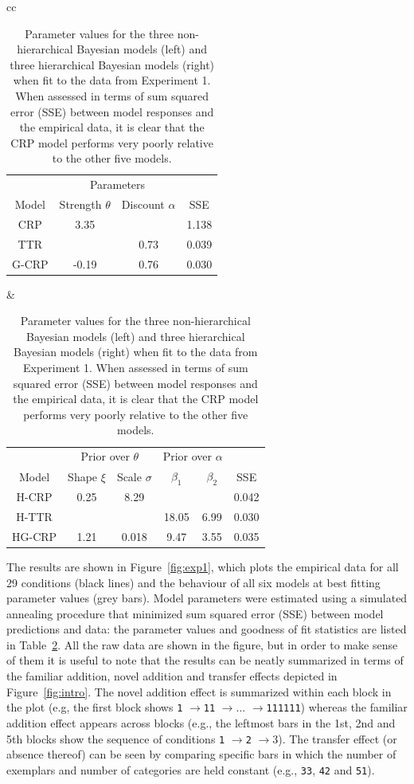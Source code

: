 \documentclass[doc]{apa6}
\newcommand{\dist}[1]{\texttt{#1}}
\newcommand{\goesto}{$\rightarrow$}
\begin{document}
\begin{table}[t]
\caption{Parameter values for the three non-hierarchical Bayesian models (left) and three hierarchical Bayesian models (right) when fit to the data from Experiment 1. When assessed in terms of sum squared error (SSE) between model responses and the empirical data, it is clear that the CRP model performs very poorly relative to the other five models.}
\label{exp1fits}
\vspace*{6pt}
\footnotesize
\begin{tabular}{cc}
\begin{tabular}{c|cc|c}
& \multicolumn{2}{c|}{Parameters} & \\
Model & Strength $\theta$ & Discount $\alpha$ & SSE \\ \hline
CRP & 3.35 &  & 1.138 \\
TTR &  & 0.73 & 0.039 \\
G-CRP & -0.19 & 0.76 & 0.030
\end{tabular}
&
\begin{tabular}{c|cc|cc|c}
& \multicolumn{2}{c|}{Prior over $\theta$} & \multicolumn{2}{c|}{Prior over $\alpha$}  \\
Model & Shape $\xi$ & Scale $\sigma$ & $\beta_1$ & $\beta_2$ & SSE \\ \hline
H-CRP & 0.25 & 8.29 & & & 0.042 \\
H-TTR & & & 18.05 & 6.99 & 0.030 \\
HG-CRP & 1.21 & 0.018 & 9.47 & 3.55 & 0.035
\end{tabular}
\end{tabular}
\end{table}

The results are shown in Figure~\ref{fig:exp1}, which plots the empirical data for all 29 conditions (black lines) and the behaviour of all six models at best fitting parameter values (grey bars). Model parameters were estimated using a simulated annealing procedure that minimized sum squared error (SSE) between model predictions and data: the parameter values and goodness of fit statistics are listed in Table~\ref{exp1fits}. All the raw data are shown in the figure, but in order to make sense of them it is useful to note that the results can be neatly summarized in terms of the familiar addition, novel addition and transfer effects depicted in Figure~\ref{fig:intro}. The novel addition effect is summarized within each block in the plot (e.g, the first block shows \dist{1} \goesto \dist{11} \goesto $\ldots$ \goesto \dist{111111}) whereas the familiar addition effect appears across blocks (e.g., the leftmost bars in the 1st, 2nd and 5th blocks show the sequence of conditions \dist{1} \goesto \dist{2} \goesto{3}). The transfer effect (or absence thereof) can be seen by comparing specific bars in which the number of exemplars and number of categories are held constant (e.g., \dist{33}, \dist{42} and \dist{51}).
\end{document}
